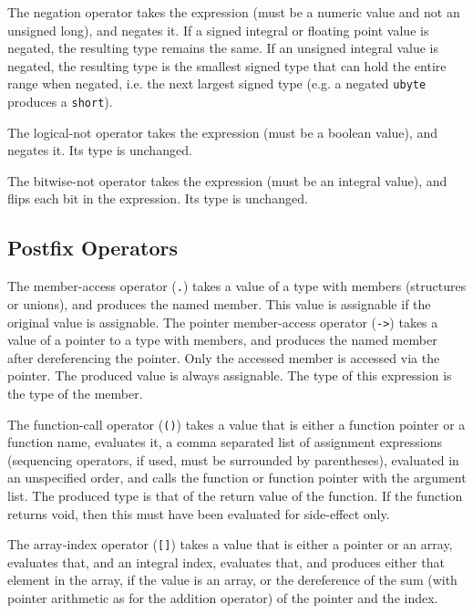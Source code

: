 \documentclass[letterpaper,12pt]{book}
\begin{document}
The negation operator takes the expression (must be a numeric value and not an unsigned long), and negates it. If a signed integral or floating point value is negated, the resulting type remains the same. If an unsigned integral value is negated, the resulting type is the smallest signed type that can hold the entire range when negated, i.e. the next largest signed type (e.g. a negated \texttt{ubyte} produces a \texttt{short}).

The logical-not operator takes the expression (must be a boolean value), and negates it. Its type is unchanged.

The bitwise-not operator takes the expression (must be an integral value), and flips each bit in the expression. Its type is unchanged.

\subsection{Postfix Operators}



The member-access operator (\texttt{.}) takes a value of a type with members (structures or unions), and produces the named member. This value is assignable if the original value is assignable. The pointer member-access operator (\texttt{->}) takes a value of a pointer to a type with members, and produces the named member after dereferencing the pointer. Only the accessed member is accessed via the pointer. The produced value is always assignable. The type of this expression is the type of the member.

The function-call operator (\texttt{()}) takes a value that is either a function pointer or a function name, evaluates it, a comma separated list of assignment expressions (sequencing operators, if used, must be surrounded by parentheses), evaluated in an unspecified order, and calls the function or function pointer with the argument list. The produced type is that of the return value of the function. If the function returns void, then this must have been evaluated for side-effect only.

The array-index operator (\texttt{[]}) takes a value that is either a pointer or an array, evaluates that, and an integral index, evaluates that, and produces either that element in the array, if the value is an array, or the dereference of the sum (with pointer arithmetic as for the addition operator) of the pointer and the index.
\end{document}
